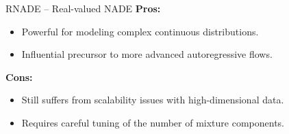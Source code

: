 \begin{frame}[allowframebreaks]{RNADE – Real-valued NADE}
    \framebreak
    \textbf{Pros:}
    \begin{itemize}
        \item Powerful for modeling complex continuous distributions.
        \item Influential precursor to more advanced autoregressive flows.
    \end{itemize}

    \textbf{Cons:}
    \begin{itemize}
        \item Still suffers from scalability issues with high-dimensional data.
        \item Requires careful tuning of the number of mixture components.
    \end{itemize}
\end{frame}
